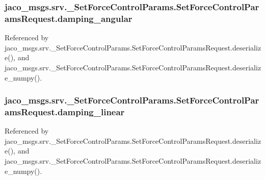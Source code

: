 \subsubsection[{\texorpdfstring{damping\+\_\+angular}{damping_angular}}]{\setlength{\rightskip}{0pt plus 5cm}jaco\+\_\+msgs.\+srv.\+\_\+\+Set\+Force\+Control\+Params.\+Set\+Force\+Control\+Params\+Request.\+damping\+\_\+angular}\hypertarget{classjaco__msgs_1_1srv_1_1__SetForceControlParams_1_1SetForceControlParamsRequest_aac62c737f326721243120ed57493f460}{}\label{classjaco__msgs_1_1srv_1_1__SetForceControlParams_1_1SetForceControlParamsRequest_aac62c737f326721243120ed57493f460}


Referenced by jaco\+\_\+msgs.\+srv.\+\_\+\+Set\+Force\+Control\+Params.\+Set\+Force\+Control\+Params\+Request.\+deserialize(), and jaco\+\_\+msgs.\+srv.\+\_\+\+Set\+Force\+Control\+Params.\+Set\+Force\+Control\+Params\+Request.\+deserialize\+\_\+numpy().

\subsubsection[{\texorpdfstring{damping\+\_\+linear}{damping_linear}}]{\setlength{\rightskip}{0pt plus 5cm}jaco\+\_\+msgs.\+srv.\+\_\+\+Set\+Force\+Control\+Params.\+Set\+Force\+Control\+Params\+Request.\+damping\+\_\+linear}\hypertarget{classjaco__msgs_1_1srv_1_1__SetForceControlParams_1_1SetForceControlParamsRequest_a9ab3c9bb200986f210612fa05012ab2f}{}\label{classjaco__msgs_1_1srv_1_1__SetForceControlParams_1_1SetForceControlParamsRequest_a9ab3c9bb200986f210612fa05012ab2f}


Referenced by jaco\+\_\+msgs.\+srv.\+\_\+\+Set\+Force\+Control\+Params.\+Set\+Force\+Control\+Params\+Request.\+deserialize(), and jaco\+\_\+msgs.\+srv.\+\_\+\+Set\+Force\+Control\+Params.\+Set\+Force\+Control\+Params\+Request.\+deserialize\+\_\+numpy().

